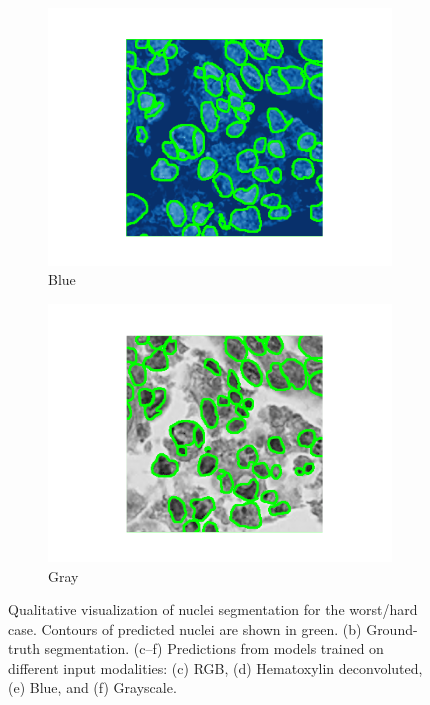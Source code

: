 \documentclass[target=bach,aauheader=,style=]{thud}
\begin{document}
\begin{figure}[!htbp]
\begin{subfigure}{0.48\textwidth}
  \centering
  \includegraphics[width=\linewidth]{imgs/qualitative/worst/Blu/contour_img.png}
  \caption{Blue}
\end{subfigure}\hfill
\begin{subfigure}{0.48\textwidth}
  \centering
  \includegraphics[width=\linewidth]{imgs/qualitative/worst/Gray/contour_img.png}
  \caption{Gray}
\end{subfigure}

\caption{Qualitative visualization of nuclei segmentation for the worst/hard case. 
Contours of predicted nuclei are shown in green. 
(b) Ground-truth segmentation. 
(c--f) Predictions from models trained on different input modalities: (c) RGB, (d) Hematoxylin deconvoluted, (e) Blue, and (f) Grayscale.}
\label{fig:qual_hard}
\end{figure}
\end{document}
